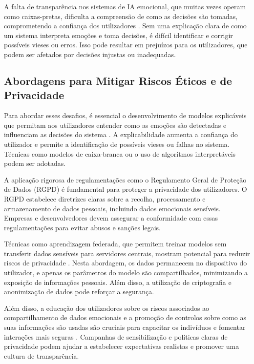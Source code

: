 \documentclass[a4paper,12pt]{report}
\begin{document}
	A falta de transparência nos sistemas de IA emocional, que muitas vezes operam como caixas-pretas, dificulta a compreensão de como as decisões são tomadas, comprometendo a confiança dos utilizadores \parencite{russell2020}. Sem uma explicação clara de como um sistema interpreta emoções e toma decisões, é difícil identificar e corrigir possíveis vieses ou erros. Isso pode resultar em prejuízos para os utilizadores, que podem ser afetados por decisões injustas ou inadequadas.
	
	\subsection{Abordagens para Mitigar Riscos Éticos e de Privacidade}
	
	Para abordar esses desafios, é essencial o desenvolvimento de modelos explicáveis que permitam aos utilizadores entender como as emoções são detectadas e influenciam as decisões do sistema \parencite{russell2020}. A explicabilidade aumenta a confiança do utilizador e permite a identificação de possíveis vieses ou falhas no sistema. Técnicas como modelos de caixa-branca ou o uso de algoritmos interpretáveis podem ser adotadas.
	
	A aplicação rigorosa de regulamentações como o Regulamento Geral de Proteção de Dados (RGPD) é fundamental para proteger a privacidade dos utilizadores. O RGPD estabelece diretrizes claras sobre a recolha, processamento e armazenamento de dados pessoais, incluindo dados emocionais sensíveis. Empresas e desenvolvedores devem assegurar a conformidade com essas regulamentações para evitar abusos e sanções legais.
	
	Técnicas como aprendizagem federada, que permitem treinar modelos sem transferir dados sensíveis para servidores centrais, mostram potencial para reduzir riscos de privacidade \parencite{pessoa2008}. Nesta abordagem, os dados permanecem no dispositivo do utilizador, e apenas os parâmetros do modelo são compartilhados, minimizando a exposição de informações pessoais. Além disso, a utilização de criptografia e anonimização de dados pode reforçar a segurança.
	
	Além disso, a educação dos utilizadores sobre os riscos associados ao compartilhamento de dados emocionais e a promoção de controlos sobre como as suas informações são usadas são cruciais para capacitar os indivíduos e fomentar interações mais seguras \parencite{slovic2007}. Campanhas de sensibilização e políticas claras de privacidade podem ajudar a estabelecer expectativas realistas e promover uma cultura de transparência.
	
\end{document}
